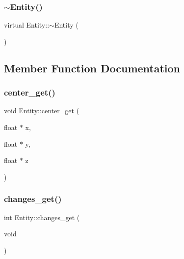 \mbox{\label{classEntity_a588098978eea6a3486b7361605ff3f0f}} 
\subsubsection{\texorpdfstring{$\sim$\+Entity()}{~Entity()}}
{\footnotesize\ttfamily virtual Entity\+::$\sim$\+Entity (\begin{DoxyParamCaption}{ }\end{DoxyParamCaption})\hspace{0.3cm}{\ttfamily [virtual]}}



\subsection{Member Function Documentation}
\mbox{\label{classEntity_af8102d176a86501d1e76adac59c280f5}} 
\subsubsection{\texorpdfstring{center\+\_\+get()}{center\_get()}}
{\footnotesize\ttfamily void Entity\+::center\+\_\+get (\begin{DoxyParamCaption}\item[{float $\ast$}]{x,  }\item[{float $\ast$}]{y,  }\item[{float $\ast$}]{z }\end{DoxyParamCaption})}

\mbox{\label{classEntity_a8414f493594b6a5746e2a959c17a2989}} 
\subsubsection{\texorpdfstring{changes\+\_\+get()}{changes\_get()}}
{\footnotesize\ttfamily int Entity\+::changes\+\_\+get (\begin{DoxyParamCaption}\item[{void}]{ }\end{DoxyParamCaption})}

